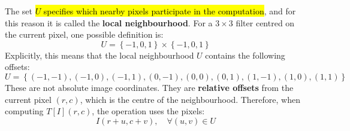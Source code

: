 \highspace
The set \hl{$U$ specifies which nearby pixels participate in the computation}, and for this reason it is called the \textbf{local neighbourhood}. For a $3 \times 3$ filter centred on the current pixel, one possible definition is:
\begin{equation*}
    U = \left\{-1, 0, 1\right\} \times \left\{-1, 0, 1\right\}
\end{equation*}
Explicitly, this means that the local neighbourhood $U$ contains the following offsets:
\begin{equation*}
    U = \left\{(-1,-1), (-1,0), (-1,1), (0,-1), (0,0), (0,1), (1,-1), (1,0), (1,1)\right\}
\end{equation*}
These are not absolute image coordinates. They are \textbf{relative offsets} from the current pixel $\left(r,c\right)$, which is the centre of the neighbourhood. Therefore, when computing $T\left[I\right]\left(r,c\right)$, the operation uses the pixels:
\begin{equation*}
    I\left(r+u, c+v\right), \quad \forall (u,v) \in U
\end{equation*}

\newpage

